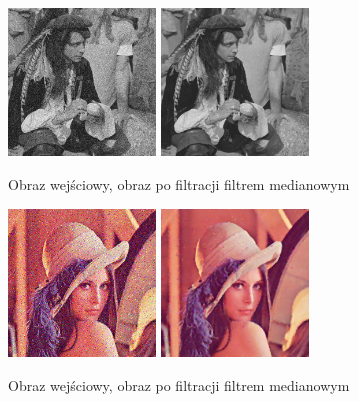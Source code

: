 \documentclass[final,a4paper,openany,12pt]{mwbk}
\begin{document}
\begin{figure}[H]
	\begin{center}
		\includegraphics[width=0.35\textwidth]{pirate_gray_noise}
		\includegraphics[width=0.35\textwidth]{pirate_gray_noise_median_result}
	\end{center}
	\caption{Obraz wejściowy, obraz po filtracji filtrem medianowym}
\end{figure}

\begin{figure}[H]
	\begin{center}
		\includegraphics[width=0.35\textwidth]{lena_color_noise}
		\includegraphics[width=0.35\textwidth]{lena_color_noise_median_result}
	\end{center}
	\caption{Obraz wejściowy, obraz po filtracji filtrem medianowym}
\end{figure}
\end{document}
